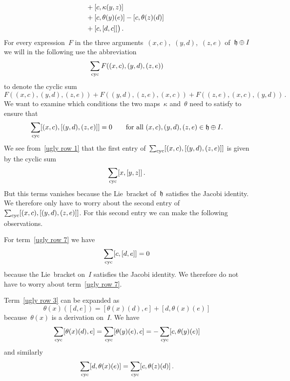 \begin{fluff}
\begin{enumerate}
\begin{align}
        \\
        {}&
        \hphantom{\bigl(}
          + [c, \kappa(y,z)]
        \label{ugly row 5}
        \\
        {}&
        \hphantom{\bigl(}
          + [c, \theta(y)(e)]
          - [c, \theta(z)(d)]
        \label{ugly row 6}
        \\
        {}&
        \hphantom{\bigl(}
          + [c, [d, c]]
        \bigr) \,.
        \label{ugly row 7}
      \end{align}
      For every expression~$F$ in the three arguments~$(x,c)$,~$(y,d)$,~$(z,e)$ of~$\mathfrak{h} \oplus I$ we will in the following use the abbreviation
      \[
        \sum_{\mathrm{cyc}} F( (x,c), (y,d), (z,e) )
      \]
      to denote the cyclic sum
      \[
        F( (x,c), (y,d), (z,e) )
        + F( (y,d), (z,e), (x,c) )
        + F( (z,e), (x,c), (y,d) ) \,.
      \]
      We want to examine which conditions the two maps~$\kappa$ and~$\theta$ need to satisfy to ensure that
      \[
        \sum_{\mathrm{cyc}}
        [(x,c), [(y,d), (z,e)]]
        =
        0
        \qquad
        \text{for all~$(x,c), (y,d), (z,e) \in \mathfrak{h} \oplus I$.}
      \]
      We see from~\eqref{ugly row 1} that the first entry of~$\sum_{\mathrm{cyc}} [(x,c), [(y,d), (z,e)]]$ is given by the cyclic sum
      \[
        \sum_{\mathrm{cyc}} [x,[y,z]] \,.
      \]
      But this terms vanishes because the Lie~bracket of~$\mathfrak{h}$ satisfies the Jacobi identity.
      We therefore only have to worry about the second entry of~$\sum_{\mathrm{cyc}} [(x,c), [(y,d), (z,e)]]$.
      For this second entry we can make the following observations.
      \begin{itemize*}
        \item
          For term~\eqref{ugly row 7} we have
          \[
            \sum_{\mathrm{cyc}} [c,[d,e]] = 0
          \]
          because the Lie~bracket on~$I$ satisfies the Jacobi identity.
          We therefore do not have to worry about term~\eqref{ugly row 7}.
        \item
          Term~\eqref{ugly row 3} can be expanded as
          \[
            \theta(x)([d,e])
            =
            [\theta(x)(d), e] + [d, \theta(x)(e)]
          \]
          because~$\theta(x)$ is a derivation on~$I$.
          We have
          \[
            \sum_{\mathrm{cyc}} [\theta(x)(d), e]
            =
            \sum_{\mathrm{cyc}} [\theta(y)(e), c]
            =
            -\sum_{\mathrm{cyc}} [c, \theta(y)(e)]
          \]
          and similarly
          \[
            \sum_{\mathrm{cyc}} [d, \theta(x)(e)]
            =
            \sum_{\mathrm{cyc}} [c, \theta(z)(d)] \,.
\]
\end{itemize*}
\end{enumerate}
\end{fluff}
